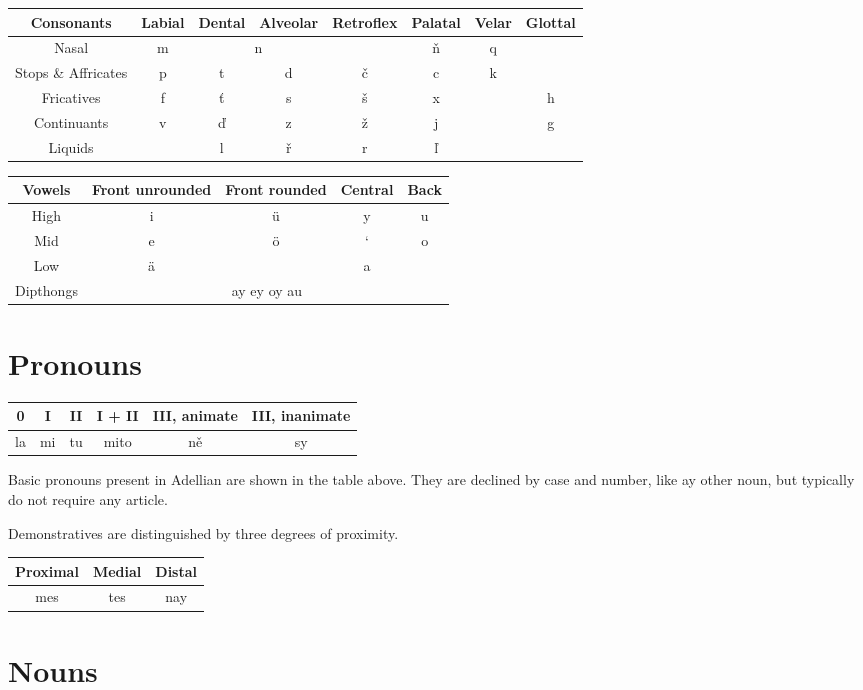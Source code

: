 \documentclass[12pt]{article}
\begin{document}
	\begin{tabular}{||c | c c c c c c c||}
		\hline
		Consonants & Labial & Dental & Alveolar &
		Retroflex & Palatal & Velar & Glottal \\
		\hline
		Nasal & m & \multicolumn{2}{c}{n} & & ň & q & \\
		Stops \& Affricates & p & t & d & č & c & k & \\
		Fricatives & f & ť & s & š & x & & h \\
		Continuants & v & ď & z & ž & j & & g \\
		Liquids & & l & ř & r & ľ & & \\
		\hline
	\end{tabular}

	\begin{tabular}{|| c | c c c c || }
		\hline
	Vowels & Front unrounded & Front rounded & Central & Back \\
	\hline
	High & i & ü & y & u \\
	Mid & e & ö & ` & o \\
	Low & ä & & a & \\
	Dipthongs & \multicolumn{4}{c}{ay ey oy au} \\
	\hline
	\end{tabular}

	\section{Pronouns}

	\begin{tabular}{|| c c c c c c ||}
		\hline
		0 & I & II & I + II & III, animate & III, inanimate\\
		\hline
		la & mi & tu & mito & ně & sy\\
		\hline
	\end{tabular}

	Basic pronouns present in Adellian are shown in the table above. They are declined by case and number, like ay other noun, but typically do not require any article.

	Demonstratives are distinguished by three degrees of proximity.

	\begin{tabular}{|| c c c ||}
		\hline
		Proximal & Medial & Distal \\
		\hline
		mes & tes &  nay \\
		\hline
	\end{tabular}

	\section{Nouns}
\end{document}
